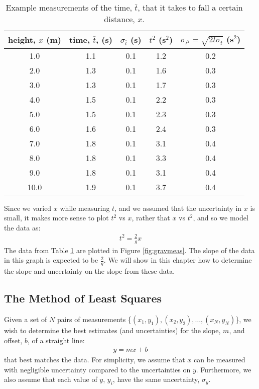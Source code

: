 \begin{table}[h!]
\center
\begin{tabular}{|c|c|c|c|c|}
\hline
\textbf{height, $x$ (m)}&\textbf{time, $\bar t$, (s)}&\textbf{$\sigma_{\bar t}$ (s)}&\textbf{$t^2$ (s$^2$)}&\textbf{$\sigma_{t^2}=\sqrt{2t\sigma_{\bar t}}$ (s$^2$)}\\
\hline
1.0 & 1.1 & 0.1 & 1.2 & 0.2 \\ 
\hline
2.0 & 1.3 & 0.1 & 1.6 & 0.3 \\ 
\hline
3.0 & 1.3 & 0.1 & 1.7 & 0.3 \\ 
\hline
4.0 & 1.5 & 0.1 & 2.2 & 0.3 \\ 
\hline
5.0 & 1.5 & 0.1 & 2.3 & 0.3 \\ 
\hline
6.0 & 1.6 & 0.1 & 2.4 & 0.3 \\ 
\hline
7.0 & 1.8 & 0.1 & 3.1 & 0.4 \\ 
\hline
8.0 & 1.8 & 0.1 & 3.3 & 0.4 \\ 
\hline
9.0 & 1.8 & 0.1 & 3.1 & 0.4 \\ 
\hline
10.0 & 1.9 & 0.1 & 3.7 & 0.4 \\ 
\hline
\end{tabular}
\caption{\label{tab:gravmeas} Example measurements of the time, $\bar t$, that it takes to fall a certain distance, $x$.}
\end{table}

Since we varied $x$ while measuring $t$, and we assumed that the uncertainty in $x$ is small, it makes more sense to plot $t^2$ vs $x$, rather that $x$ vs $t^2$, and so we model the data as:
\begin{align}
\label{eqn:t2ofx}
t^2 = \frac{2}{g}x
\end{align}
The data from Table \ref{tab:gravmeas} are plotted in Figure \ref{fig:gravmeas}. The slope of the data in this graph is expected to be $\frac{2}{g}$. We will show in this chapter how to determine the slope and uncertainty on the slope from these data. 


\subsection{The Method of Least Squares}
Given a set of $N$ pairs of measurements \{$(x_1,y_1), (x_2,y_2), \dots, (x_N,y_N)$\}, we wish to determine the best estimates (and uncertainties) for the slope, $m$, and offset, $b$, of a straight line:
\begin{align}
\label{eqn:mbmodel}
y=mx+b
\end{align}
that best matches the data. For simplicity, we assume that $x$ can be measured with negligible uncertainty compared to the uncertainties on $y$. Furthermore, we also assume that each value of $y$, $y_i$, have the same uncertainty, $\sigma_{y}$.

